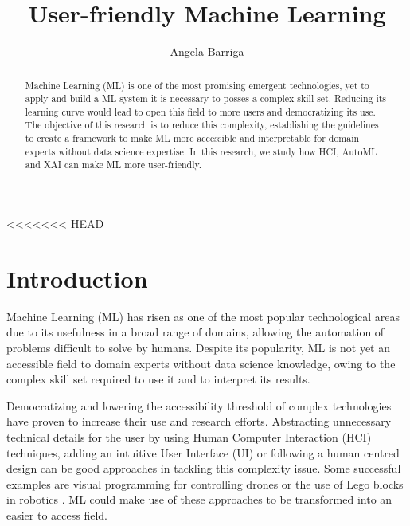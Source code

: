 \documentclass[runningheads]{llncs}
\begin{document}
<<<<<<< HEAD
	\title{User-friendly Machine Learning}
	\author{Angela Barriga}
	\maketitle              %
	\begin{abstract}
	Machine Learning (ML) is one of the most promising emergent technologies, yet to apply
	and build a ML system it is necessary to posses a complex skill set. Reducing its
	learning curve would lead to open this field to more users and democratizing its use. 
	The objective of this research is to reduce this complexity, establishing the guidelines to 
	create a framework to make ML more accessible and interpretable for domain experts without data science expertise. In this research, we study how HCI, AutoML and XAI can make ML more user-friendly.
		
	\end{abstract}
	\section{Introduction}\label{intro}
		
	Machine Learning (ML) has risen as one of the most popular technological areas due to its usefulness in
	a broad range of domains, allowing the automation of problems difficult to solve by humans. Despite its
	popularity, ML is not yet an accessible field to domain experts without data science knowledge, owing
	to the complex skill set required to use it and to interpret its results.  
	
	Democratizing and lowering the accessibility threshold of complex technologies have proven to increase
	their use and research efforts. Abstracting unnecessary technical details for the user by using Human
	Computer Interaction (HCI) techniques, adding an intuitive User Interface (UI) or following a human
	centred design can be good approaches in tackling this complexity issue. Some successful
	examples are visual programming for controlling drones \cite{dronely} or the use of Lego blocks in
	robotics \cite{lego}. ML could make use of these approaches to be transformed into an easier to
	access field. 
	
\end{document}
